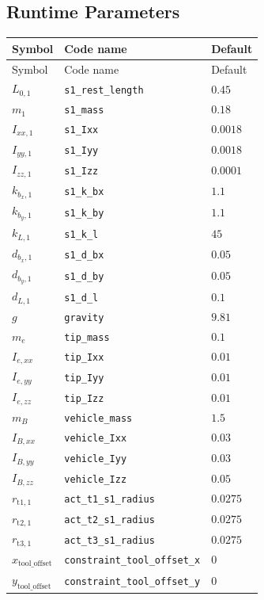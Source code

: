 \documentclass[11pt]{article}
\begin{document}
\subsection{Runtime Parameters}
\begin{longtable}{lll}
\hline
Symbol & Code name & Default \\
\hline
\endfirsthead
\hline Symbol & Code name & Default \\
\hline
\endhead
$L_{0,1}$ & \texttt{s1\_rest\_length} & $0.45$ \\
$m_{1}$ & \texttt{s1\_mass} & $0.18$ \\
$I_{xx,1}$ & \texttt{s1\_Ixx} & $0.0018$ \\
$I_{yy,1}$ & \texttt{s1\_Iyy} & $0.0018$ \\
$I_{zz,1}$ & \texttt{s1\_Izz} & $0.0001$ \\
$k_{b_x,1}$ & \texttt{s1\_k\_bx} & $1.1$ \\
$k_{b_y,1}$ & \texttt{s1\_k\_by} & $1.1$ \\
$k_{L,1}$ & \texttt{s1\_k\_l} & $45$ \\
$d_{b_x,1}$ & \texttt{s1\_d\_bx} & $0.05$ \\
$d_{b_y,1}$ & \texttt{s1\_d\_by} & $0.05$ \\
$d_{L,1}$ & \texttt{s1\_d\_l} & $0.1$ \\
$g$ & \texttt{gravity} & $9.81$ \\
$m_e$ & \texttt{tip\_mass} & $0.1$ \\
$I_{e,xx}$ & \texttt{tip\_Ixx} & $0.01$ \\
$I_{e,yy}$ & \texttt{tip\_Iyy} & $0.01$ \\
$I_{e,zz}$ & \texttt{tip\_Izz} & $0.01$ \\
$m_B$ & \texttt{vehicle\_mass} & $1.5$ \\
$I_{B,xx}$ & \texttt{vehicle\_Ixx} & $0.03$ \\
$I_{B,yy}$ & \texttt{vehicle\_Iyy} & $0.03$ \\
$I_{B,zz}$ & \texttt{vehicle\_Izz} & $0.05$ \\
$r_{\mathrm{t1},1}$ & \texttt{act\_t1\_s1\_radius} & $0.0275$ \\
$r_{\mathrm{t2},1}$ & \texttt{act\_t2\_s1\_radius} & $0.0275$ \\
$r_{\mathrm{t3},1}$ & \texttt{act\_t3\_s1\_radius} & $0.0275$ \\
$x_{\mathrm{tool\_offset}}$ & \texttt{constraint\_tool\_offset\_x} & $0$ \\
$y_{\mathrm{tool\_offset}}$ & \texttt{constraint\_tool\_offset\_y} & $0$ \\

\end{longtable}
\end{document}
